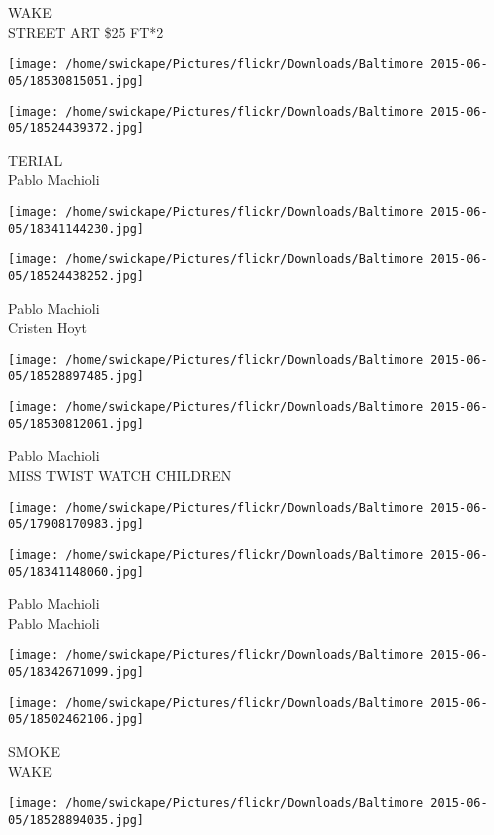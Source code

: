 \documentclass[10pt,letterpaper]{article}
\begin{document}
WAKE\\
STREET ART \$25 FT*2
\pagebreak

\texttt{[image: /home/swickape/Pictures/flickr/Downloads/Baltimore 2015-06-05/18530815051.jpg]}

\vspace{0.25in}
\texttt{[image: /home/swickape/Pictures/flickr/Downloads/Baltimore 2015-06-05/18524439372.jpg]}

TERIAL\\
Pablo Machioli
\pagebreak

\texttt{[image: /home/swickape/Pictures/flickr/Downloads/Baltimore 2015-06-05/18341144230.jpg]}

\vspace{0.25in}
\texttt{[image: /home/swickape/Pictures/flickr/Downloads/Baltimore 2015-06-05/18524438252.jpg]}

Pablo Machioli\\
Cristen Hoyt
\pagebreak

\texttt{[image: /home/swickape/Pictures/flickr/Downloads/Baltimore 2015-06-05/18528897485.jpg]}

\vspace{0.25in}
\texttt{[image: /home/swickape/Pictures/flickr/Downloads/Baltimore 2015-06-05/18530812061.jpg]}

Pablo Machioli\\
MISS TWIST WATCH CHILDREN
\pagebreak

\texttt{[image: /home/swickape/Pictures/flickr/Downloads/Baltimore 2015-06-05/17908170983.jpg]}

\vspace{0.25in}
\texttt{[image: /home/swickape/Pictures/flickr/Downloads/Baltimore 2015-06-05/18341148060.jpg]}

Pablo Machioli\\
Pablo Machioli
\pagebreak

\texttt{[image: /home/swickape/Pictures/flickr/Downloads/Baltimore 2015-06-05/18342671099.jpg]}

\vspace{0.25in}
\texttt{[image: /home/swickape/Pictures/flickr/Downloads/Baltimore 2015-06-05/18502462106.jpg]}

SMOKE\\
WAKE
\pagebreak

\texttt{[image: /home/swickape/Pictures/flickr/Downloads/Baltimore 2015-06-05/18528894035.jpg]}
\end{document}
